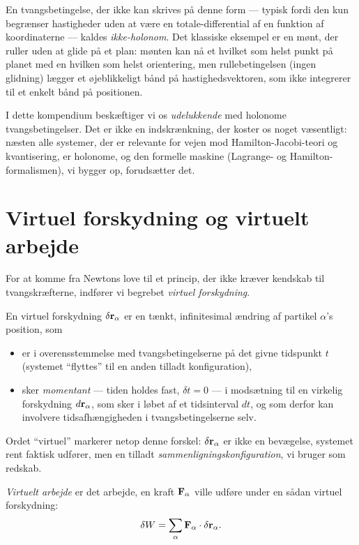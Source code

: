 En tvangsbetingelse, der ikke kan skrives på denne form — typisk fordi
den kun begrænser hastigheder uden at være en totale-differential af
en funktion af koordinaterne — kaldes \emph{ikke-holonom}. Det klassiske
eksempel er en mønt, der ruller uden at glide på et plan: mønten kan nå
et hvilket som helst punkt på planet med en hvilken som helst
orientering, men rullebetingelsen (ingen glidning) lægger et
øjeblikkeligt bånd på hastighedsvektoren, som ikke integrerer til et
enkelt bånd på positionen.

I dette kompendium beskæftiger vi os \emph{udelukkende} med holonome
tvangsbetingelser. Det er ikke en indskrænkning, der koster os noget
væsentligt: næsten alle systemer, der er relevante for vejen mod
Hamilton-Jacobi-teori og kvantisering, er holonome, og den formelle
maskine (Lagrange- og Hamilton-formalismen), vi bygger op, forudsætter
det.

\section{Virtuel forskydning og virtuelt arbejde}

For at komme fra Newtons love til et princip, der ikke kræver kendskab
til tvangskræfterne, indfører vi begrebet \emph{virtuel
forskydning}.

En virtuel forskydning $\delta\vb{r}_\alpha$ er en tænkt,
infinitesimal ændring af partikel $\alpha$'s position, som

\begin{itemize}
  \item er i overensstemmelse med tvangsbetingelserne på det givne
        tidspunkt $t$ (systemet ``flyttes'' til en anden tilladt
        konfiguration),
  \item sker \emph{momentant} — tiden holdes fast, $\delta t = 0$ — i
        modsætning til en virkelig forskydning $d\vb{r}_\alpha$, som
        sker i løbet af et tidsinterval $dt$, og som derfor kan
        involvere tidsafhængigheden i tvangsbetingelserne selv.
\end{itemize}

Ordet ``virtuel'' markerer netop denne forskel: $\delta\vb{r}_\alpha$ er
ikke en bevægelse, systemet rent faktisk udfører, men en tilladt
\emph{sammenligningskonfiguration}, vi bruger som redskab.

\emph{Virtuelt arbejde} er det arbejde, en kraft $\vb{F}_\alpha$ ville
udføre under en sådan virtuel forskydning:
\begin{equation}
  \delta W = \sum_{\alpha} \vb{F}_\alpha \cdot \delta\vb{r}_\alpha.
\end{equation}

